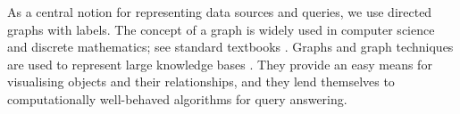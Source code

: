 %

As 
a central notion for representing data sources
and queries, we use directed graphs with labels.
The concept of a graph is widely used in computer science and discrete mathematics;
see standard textbooks \autocite[e.g.,][]{Diestel2012}.
Graphs and graph techniques are used to represent large knowledge bases \autocite[e.g.,][]{Ehrlinger2016}.
They provide an easy means for visualising objects and their relationships,
and they lend themselves to computationally well-behaved algorithms for query answering. 

